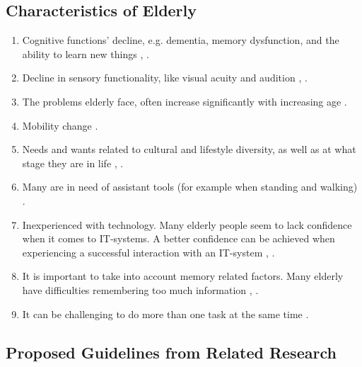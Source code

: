 \subsection{Characteristics of Elderly}
\label{subsec:characteristics}
\begin{enumerate}[{c}.1]
\item Cognitive functions' decline, e.g. dementia, memory dysfunction, and the ability to learn new things \cite{Billis}, \cite{gregor}.
\item Decline in sensory functionality, like  visual acuity and audition \cite{Billis}, \cite{gregor}.
\item The problems elderly face, often increase significantly with increasing age \cite{gregor}.
\item Mobility change \cite{Billis}.
\item Needs and wants related to cultural and lifestyle diversity, as well as at what stage they are in life \cite{Billis}, \cite{gregor}.
\item Many are in need of assistant tools (for example when standing and walking) \cite{gregor}.
\item Inexperienced with technology. Many elderly people seem to lack confidence when it comes to IT-systems. A better confidence can be achieved when experiencing a successful interaction with an IT-system \cite{Billis}, \cite{gregor}.
\item It is important to take into account memory related factors. Many elderly have difficulties remembering too much information \cite{Billis}, \cite{gregor}.
\item It can be challenging to do more than one task at the same time \cite{bruin}.
\end{enumerate}

\subsection{Proposed Guidelines from Related Research}
\label{subsec:guidelines}

